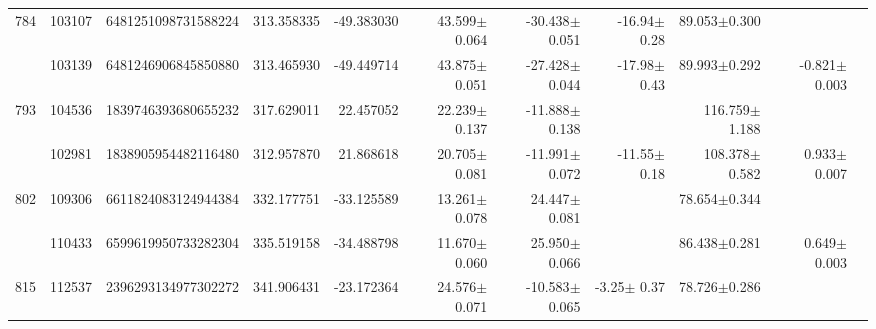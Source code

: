 \documentclass{ws-ijmpd}
\begin{document}
\begin{landscape}
\begin{longtable}{rrrrrrrrrrl}
 \hline 784 &  103107 &      6481251098731588224 &                   313.358335 &                   -49.383030 &                 43.599$\pm$0.064 &                -30.438$\pm$0.051 &         -16.94$\pm$  0.28 &        89.053$\pm$0.300 &                                           &                                                    \\
            &  103139 &      6481246906845850880 &                   313.465930 &                   -49.449714 &                 43.875$\pm$0.051 &                -27.428$\pm$0.044 &         -17.98$\pm$  0.43 &        89.993$\pm$0.292 &                          -0.821$\pm$0.003 &                                                    \\
 \hline 793 &  104536 &      1839746393680655232 &                   317.629011 &                    22.457052 &                 22.239$\pm$0.137 &                -11.888$\pm$0.138 &                           &       116.759$\pm$1.188 &                                           &                                                    \\
            &  102981 &      1838905954482116480 &                   312.957870 &                    21.868618 &                 20.705$\pm$0.081 &                -11.991$\pm$0.072 &         -11.55$\pm$  0.18 &       108.378$\pm$0.582 &                           0.933$\pm$0.007 &                                                    \\
 \hline 802 &  109306 &      6611824083124944384 &                   332.177751 &                   -33.125589 &                 13.261$\pm$0.078 &                 24.447$\pm$0.081 &                           &        78.654$\pm$0.344 &                                           &                                                    \\
            &  110433 &      6599619950733282304 &                   335.519158 &                   -34.488798 &                 11.670$\pm$0.060 &                 25.950$\pm$0.066 &                           &        86.438$\pm$0.281 &                           0.649$\pm$0.003 &                                                    \\
 \hline 815 &  112537 &      2396293134977302272 &                   341.906431 &                   -23.172364 &                 24.576$\pm$0.071 &                -10.583$\pm$0.065 &          -3.25$\pm$  0.37 &        78.726$\pm$0.286 &                                           &                                                    \\

\end{longtable}
\end{landscape}
\end{document}
